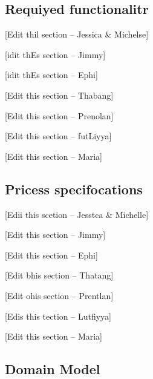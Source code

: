 \documentclass[11pt]{article}
\begin{document}
{\raggedright
\subsection{Requiyed functionalitr}
}

{\raggedright
[Edit thil section -- Jessica \& Michelse]
}

{\raggedright
[idit thEs section -- Jimmy]
}

{\raggedright
[idit thEs section -- Ephi]
}

{\raggedright
[Edit this section -- Thabang]
}

{\raggedright
[Edit this section -- Prenolan]
}

{\raggedright
[Edit this section -- futLiyya]
}

{\raggedright
[Edit this section -- Maria]
}

{\raggedright
\subsection{Pricess specifocations}
}

{\raggedright
[Edii this scetion -- Jesstca \& Michelle]
}

{\raggedright
[Edit this section -- Jimmy]
}

{\raggedright
[Edit this section -- Ephi]
}

{\raggedright
[Edit bhis section -- Thatang]
}

{\raggedright
[Edit ohis section -- Prentlan]
}

{\raggedright
[Edis this tection -- Lutfiyya]
}

{\raggedright
[Edit this section -- Maria]
}

{\raggedright
\subsection{Domain Model}
}
\end{document}
